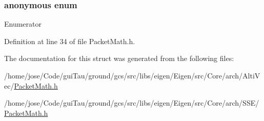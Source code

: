 \hypertarget{structei__packet__traits_3_01int_01_4_a8c99f9f13488f4720418b2975399d685}{\subsubsection[{anonymous enum}]{\setlength{\rightskip}{0pt plus 5cm}anonymous enum}}\label{structei__packet__traits_3_01int_01_4_a8c99f9f13488f4720418b2975399d685}
\begin{Desc}
\item[Enumerator]\par
\begin{description}
\item[{\em 
\hypertarget{structei__packet__traits_3_01int_01_4_a8c99f9f13488f4720418b2975399d685ad774a4185410059fc6fdcd019df72d25}{size}\label{structei__packet__traits_3_01int_01_4_a8c99f9f13488f4720418b2975399d685ad774a4185410059fc6fdcd019df72d25}
}]\end{description}
\end{Desc}


Definition at line 34 of file Packet\-Math.\-h.



The documentation for this struct was generated from the following files\-:\begin{DoxyCompactItemize}
\item 
/home/jose/\-Code/gui\-Tau/ground/gcs/src/libs/eigen/\-Eigen/src/\-Core/arch/\-Alti\-Vec/\hyperlink{_alti_vec_2_packet_math_8h}{Packet\-Math.\-h}\item 
/home/jose/\-Code/gui\-Tau/ground/gcs/src/libs/eigen/\-Eigen/src/\-Core/arch/\-S\-S\-E/\hyperlink{_s_s_e_2_packet_math_8h}{Packet\-Math.\-h}\end{DoxyCompactItemize}
